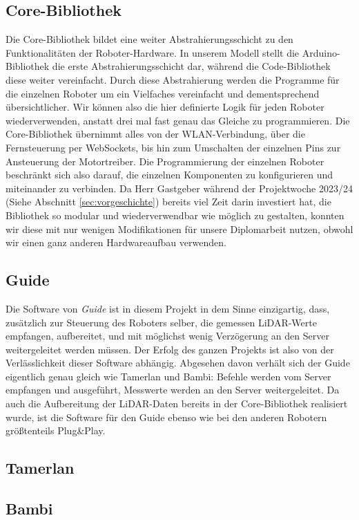 \subsection{Core-Bibliothek}
\label{subec:robots_core}
Die Core-Bibliothek bildet eine weiter Abstrahierungsschicht zu den Funktionalitäten der Roboter-Hardware.
%
In unserem Modell stellt die Arduino-Bibliothek die erste Abstrahierungsschicht dar,
während die Code-Bibliothek diese weiter vereinfacht.
%
Durch diese Abstrahierung werden die Programme für die einzelnen Roboter um ein Vielfaches vereinfacht und dementsprechend übersichtlicher.
%
Wir können also die hier definierte Logik für jeden Roboter wiederverwenden,
anstatt drei mal fast genau das Gleiche zu programmieren.
%
Die Core-Bibliothek übernimmt alles von der WLAN-Verbindung,
über die Fernsteuerung per WebSockets,
bis hin zum Umschalten der einzelnen Pins zur Ansteuerung der Motortreiber.
%
Die Programmierung der einzelnen Roboter beschränkt sich also darauf,
die einzelnen Komponenten zu konfigurieren und miteinander zu verbinden.
%
Da Herr Gastgeber während der Projektwoche 2023/24 (Siehe Abschnitt \ref{sec:vorgeschichte}) bereits viel Zeit darin investiert hat,
die Bibliothek so modular und wiederverwendbar wie möglich zu gestalten,
konnten wir diese mit nur wenigen Modifikationen für unsere Diplomarbeit nutzen,
obwohl wir einen ganz anderen Hardwareaufbau verwenden.

\subsection{Guide}
\label{subsec:software_guide}
Die Software von \textit{Guide} ist in diesem Projekt in dem Sinne einzigartig,
dass,
zusätzlich zur Steuerung des Roboters selber,
die gemessen LiDAR-Werte empfangen,
aufbereitet,
und mit möglichst wenig Verzögerung an den Server weitergeleitet werden müssen.
%
Der Erfolg des ganzen Projekts ist also von der Verlässlichkeit dieser Software abhängig.
%
Abgesehen davon verhält sich der Guide eigentlich genau gleich wie Tamerlan und Bambi:
%
Befehle werden vom Server empfangen und ausgeführt,
Messwerte werden an den Server weitergeleitet.
%
Da auch die Aufbereitung der LiDAR-Daten bereits in der Core-Bibliothek realisiert wurde,
ist die Software für den Guide ebenso wie bei den anderen Robotern größtenteils Plug\&Play.

\subsection{Tamerlan}
\label{subsec:software_tamerlan}

\subsection{Bambi}
\label{subsec:software_bambi}
